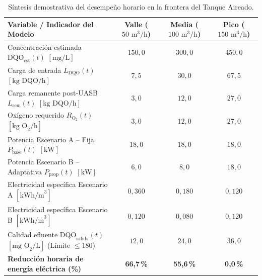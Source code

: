 \documentclass[11pt, a4paper]{article}
\begin{document}
\vspace{0.5em}
\begin{table}[h!]
\centering
\small
{}
\begin{tabularx}{\textwidth}{l c c c}
\toprule
\textbf{Variable / Indicador del Modelo} & \textbf{Valle ($50\text{ m}^3/\text{h}$)} & \textbf{Media ($100\text{ m}^3/\text{h}$)} & \textbf{Pico ($150\text{ m}^3/\text{h}$)} \\
\midrule
Concentración estimada $\text{DQO}_{\text{est}}(t)$ $\left[\text{mg/L}\right]$ & $150{,}0$ & $300{,}0$ & $450{,}0$ \\
Carga de entrada $L_{\text{DQO}}(t)$ $\left[\text{kg DQO/h}\right]$ & $7{,}5$ & $30{,}0$ & $67{,}5$ \\
Carga remanente post-UASB $L_{\text{rem}}(t)$ $\left[\text{kg DQO/h}\right]$ & $3{,}0$ & $12{,}0$ & $27{,}0$ \\
Oxígeno requerido $R_{\text{O}_2}(t)$ $\left[\text{kg O}_2/\text{h}\right]$ & $3{,}0$ & $12{,}0$ & $27{,}0$ \\
Potencia Escenario A -- Fija $P_{\text{base}}(t)$ $\left[\text{kW}\right]$ & $18{,}0$ & $18{,}0$ & $18{,}0$ \\
Potencia Escenario B -- Adaptativa $P_{\text{prop}}(t)$ $\left[\text{kW}\right]$ & $6{,}0$ & $8{,}0$ & $18{,}0$ \\
Electricidad específica Escenario A $\left[\text{kWh/m}^3\right]$ & $0{,}360$ & $0{,}180$ & $0{,}120$ \\
Electricidad específica Escenario B $\left[\text{kWh/m}^3\right]$ & $0{,}120$ & $0{,}080$ & $0{,}120$ \\
Calidad efluente $\text{DQO}_{\text{salida}}(t)$ $\left[\text{mg O}_2/\text{L}\right]$ (Límite $\le 180$) & $12{,}0$ & $24{,}0$ & $36{,}0$ \\
\textbf{Reducción horaria de energía eléctrica (\%)} & \textbf{66,7\,\%} & \textbf{55,6\,\%} & \textbf{0,0\,\%} \\
\bottomrule
\end{tabularx}
\caption{Síntesis demostrativa del desempeño horario en la frontera del Tanque Aireado.}
\end{table}
\end{document}
